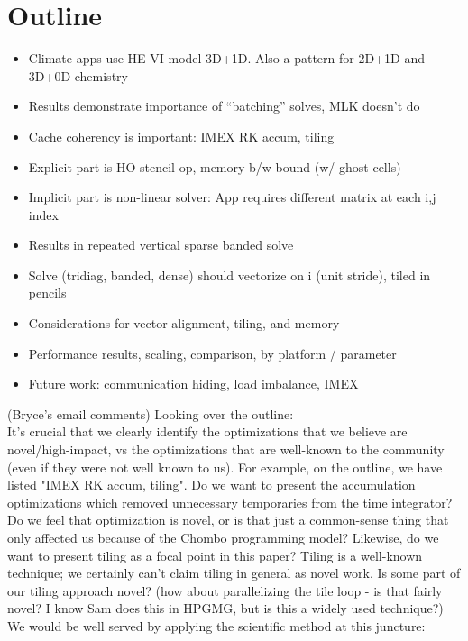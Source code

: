 \documentclass[conference]{IEEEtran}
\begin{document}
\section*{Outline}
\begin{itemize}
\item Climate apps use HE-VI model 3D+1D. Also a pattern for 2D+1D and 3D+0D chemistry
\item Results demonstrate importance of ``batching'' solves, MLK doesn't do
\item Cache coherency is important: IMEX RK accum, tiling
\item Explicit part is HO stencil op, memory b/w bound (w/ ghost cells)
\item Implicit part is non-linear solver: App requires different matrix at each i,j index 
\item Results in repeated vertical sparse banded solve
\item Solve (tridiag, banded, dense) should vectorize on i (unit stride), tiled in pencils
\item Considerations for vector alignment, tiling, and memory
\item Performance results, scaling, comparison, by platform / parameter
\item Future work: communication hiding, load imbalance, IMEX
\end{itemize}
(Bryce's email comments) Looking over the outline:
\\
It's crucial that we clearly identify the optimizations that we
believe are novel/high-impact, vs the optimizations that are
well-known to the community (even if they were not well known to us).
For example, on the outline, we have listed "IMEX RK accum, tiling".
Do we want to present the accumulation optimizations which removed
unnecessary temporaries from the time integrator? Do we feel that
optimization is novel, or is that just a common-sense thing that only
affected us because of the Chombo programming model? Likewise, do we
want to present tiling as a focal point in this paper? Tiling is a
well-known technique; we certainly can't claim tiling in general as
novel work. Is some part of our tiling approach novel? (how about
parallelizing the tile loop - is that fairly novel? I know Sam does
this in HPGMG, but is this a widely used technique?)
\\
We would be well served by applying the scientific method at this juncture:
\\
\end{document}
